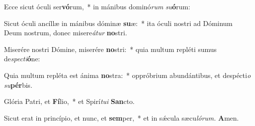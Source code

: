 \item Ecce sicut óculi ser\textbf{vó}rum,~* in mánibus dominó\textit{rum} \textit{su}\textbf{ó}rum:
\item Sicut óculi ancíllæ in mánibus dóminæ \textbf{su}æ:~* ita óculi nostri ad Dóminum Deum nostrum, donec misere\hspace{0.03em}\textit{átur} \textbf{no}stri.
\item Miserére nostri Dómine, miserére \textbf{no}stri:~* quia multum repléti sumus de\hspace{0.03em}\textit{specti}\textbf{ó}ne:
\item Quia multum repléta est ánima \textbf{no}stra:~* oppróbrium abundántibus, et despécti\textit{o} \textit{su}\textbf{pér}bis.
\item Glória Patri, et \textbf{Fí}lio,~* et Spirí\hspace{0.03em}\textit{tu}\textit{i} \textbf{San}cto.
\item Sicut erat in princípio, et nunc, et \textbf{sem}per,~* et in sǽcula sæcu\hspace{0.03em}\textit{lórum.} \textbf{A}men.

